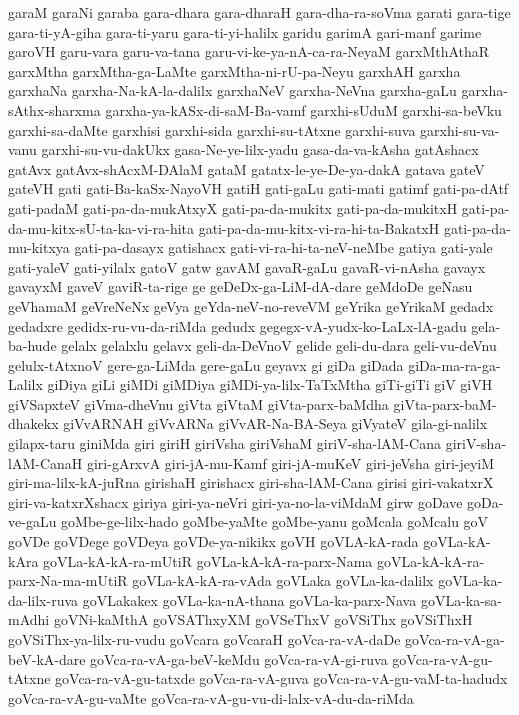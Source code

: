 {garaM
garaNi
garaba
gara-dhara
gara-dharaH
gara-dha-ra-soVma
garati
gara-tige
gara-ti-yA-giha
gara-ti-yaru
gara-ti-yi-halilx
garidu
garimA
gari-manf
garime
garoVH
garu-vara
garu-va-tana
garu-vi-ke-ya-nA-ca-ra-NeyaM
garxMthAthaR
garxMtha
garxMtha-ga-LaMte
garxMtha-ni-rU-pa-Neyu
garxhAH
garxha
garxhaNa
garxha-Na-kA-la-dalilx
garxhaNeV
garxha-NeVna
garxha-gaLu
garxha-sAthx-sharxma
garxha-ya-kASx-di-saM-Ba-vamf
garxhi-sUduM
garxhi-sa-beVku
garxhi-sa-daMte
garxhisi
garxhi-sida
garxhi-su-tAtxne
garxhi-suva
garxhi-su-va-vanu
garxhi-su-vu-dakUkx
gasa-Ne-ye-lilx-yadu
gasa-da-va-kAsha
gatAshacx
gatAvx
gatAvx-shAcxM-DAlaM
gataM
gatatx-le-ye-De-ya-dakA
gatava
gateV
gateVH
gati
gati-Ba-kaSx-NayoVH
gatiH
gati-gaLu
gati-mati
gatimf
gati-pa-dAtf
gati-padaM
gati-pa-da-mukAtxyX
gati-pa-da-mukitx
gati-pa-da-mukitxH
gati-pa-da-mu-kitx-sU-ta-ka-vi-ra-hita
gati-pa-da-mu-kitx-vi-ra-hi-ta-BakatxH
gati-pa-da-mu-kitxya
gati-pa-dasayx
gatishacx
gati-vi-ra-hi-ta-neV-neMbe
gatiya
gati-yale
gati-yaleV
gati-yilalx
gatoV
gatw
gavAM
gavaR-gaLu
gavaR-vi-nAsha
gavayx
gavayxM
gaveV
gaviR-ta-rige
ge
geDeDx-ga-LiM-dA-dare
geMdoDe
geNasu
geVhamaM
geVreNeNx
geVya
geYda-neV-no-reveVM
geYrika
geYrikaM
gedadx
gedadxre
gedidx-ru-vu-da-riMda
gedudx
gegegx-vA-yudx-ko-LaLx-lA-gadu
gela-ba-hude
gelalx
gelalxlu
gelavx
geli-da-DeVnoV
gelide
geli-du-dara
geli-vu-deVnu
gelulx-tAtxnoV
gere-ga-LiMda
gere-gaLu
geyavx
gi
giDa
giDada
giDa-ma-ra-ga-Lalilx
giDiya
giLi
giMDi
giMDiya
giMDi-ya-lilx-TaTxMtha
giTi-giTi
giV
giVH
giVSapxteV
giVma-dheVnu
giVta
giVtaM
giVta-parx-baMdha
giVta-parx-baM-dhakekx
giVvARNAH
giVvARNa
giVvAR-Na-BA-Seya
giVyateV
gila-gi-nalilx
gilapx-taru
giniMda
giri
giriH
giriVsha
giriVshaM
giriV-sha-lAM-Cana
giriV-sha-lAM-CanaH
giri-gArxvA
giri-jA-mu-Kamf
giri-jA-muKeV
giri-jeVsha
giri-jeyiM
giri-ma-lilx-kA-juRna
girishaH
girishacx
giri-sha-lAM-Cana
girisi
giri-vakatxrX
giri-va-katxrXshacx
giriya
giri-ya-neVri
giri-ya-no-la-viMdaM
girw
goDave
goDa-ve-gaLu
goMbe-ge-lilx-hado
goMbe-yaMte
goMbe-yanu
goMcala
goMcalu
goV
goVDe
goVDege
goVDeya
goVDe-ya-nikikx
goVH
goVLA-kA-rada
goVLa-kA-kAra
goVLa-kA-kA-ra-mUtiR
goVLa-kA-kA-ra-parx-Nama
goVLa-kA-kA-ra-parx-Na-ma-mUtiR
goVLa-kA-kA-ra-vAda
goVLaka
goVLa-ka-dalilx
goVLa-ka-da-lilx-ruva
goVLakakex
goVLa-ka-nA-thana
goVLa-ka-parx-Nava
goVLa-ka-sa-mAdhi
goVNi-kaMthA
goVSAThxyXM
goVSeThxV
goVSiThx
goVSiThxH
goVSiThx-ya-lilx-ru-vudu
goVcara
goVcaraH
goVca-ra-vA-daDe
goVca-ra-vA-ga-beV-kA-dare
goVca-ra-vA-ga-beV-keMdu
goVca-ra-vA-gi-ruva
goVca-ra-vA-gu-tAtxne
goVca-ra-vA-gu-tatxde
goVca-ra-vA-guva
goVca-ra-vA-gu-vaM-ta-hadudx
goVca-ra-vA-gu-vaMte
goVca-ra-vA-gu-vu-di-lalx-vA-du-da-riMda
}
